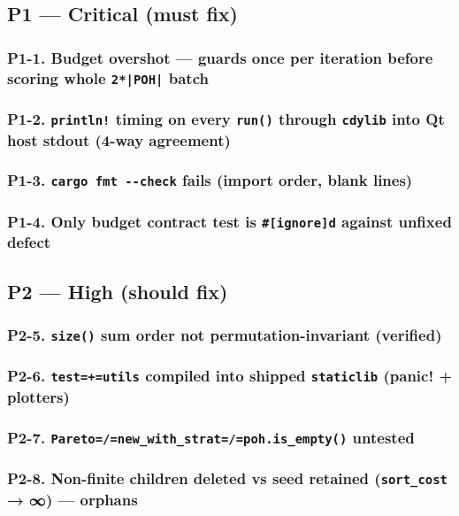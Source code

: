 \documentclass[11pt]{article}
\begin{document}
\subsection{P1 — Critical (must fix)}
\label{sec:org5686db2}

\subsubsection{P1-1. Budget overshot — guards once per iteration before scoring whole \texttt{2*|POH|} batch}
\label{sec:org72face8}
\subsubsection{P1-2. \texttt{println!} timing on every \texttt{run()} through \texttt{cdylib} into Qt host stdout (4-way agreement)}
\label{sec:org4805ea4}
\subsubsection{P1-3. \texttt{cargo fmt -{}-{}check} fails (import order, blank lines)}
\label{sec:orgdb38cf4}
\subsubsection{P1-4. Only budget contract test is \texttt{\#[ignore]d} against unfixed defect}
\label{sec:org850f0f0}
\subsection{P2 — High (should fix)}
\label{sec:orge4e2a9e}

\subsubsection{P2-5. \texttt{size()} sum order not permutation-invariant (verified)}
\label{sec:orgef87657}
\subsubsection{P2-6. \texttt{test=+=utils} compiled into shipped \texttt{staticlib} (panic! + plotters)}
\label{sec:org663078a}
\subsubsection{P2-7. \texttt{Pareto=/=new\_with\_strat=/=poh.is\_empty()} untested}
\label{sec:org8363452}
\subsubsection{P2-8. Non-finite children deleted vs seed retained (\texttt{sort\_cost} → ∞) — orphans}
\label{sec:orgb8a3677}
\end{document}
